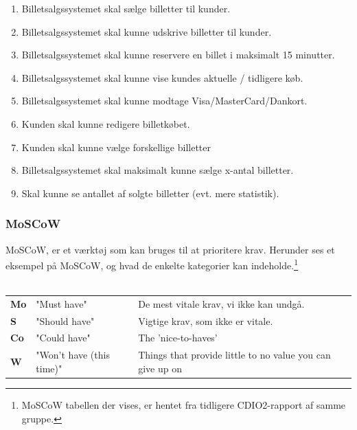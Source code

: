 \begin{enumerate}
    \item Billetsalgssystemet skal sælge billetter til kunder.
    \item Billetsalgssystemet skal kunne udskrive billetter til kunder.
    \item Billetsalgssystemet skal kunne reservere en billet i maksimalt 15 minutter.
    \item Billetsalgssystemet skal kunne vise kundes aktuelle / tidligere køb.
    \item Billetsalgssystemet skal kunne modtage Visa/MasterCard/Dankort.
    \item Kunden skal kunne redigere billetkøbet.
    \item Kunden skal kunne vælge forskellige billetter
    \item Billetsalgssystemet skal maksimalt kunne sælge x-antal billetter.
    \item Skal kunne se antallet af solgte billetter (evt. mere statistik).
\end{enumerate}

\subsubsection{MoSCoW}

MoSCoW, er et værktøj som kan bruges til at prioritere krav.
Herunder ses et eksempel på MoSCoW, og hvad de enkelte kategorier kan indeholde.\footnote{MoSCoW tabellen der vises, er hentet fra tidligere CDIO2-rapport af samme gruppe.} \\\\

\begin{tabular}{lll}
    \textbf{Mo} &   
    "Must have"                 &
    De mest vitale krav, vi ikke kan undgå. \\

    \textbf{S}  &   
    "Should have"               & 
    Vigtige krav, som ikke er vitale. \\

    \textbf{Co} &   
    "Could have"                & 
    The 'nice-to-haves' \\

    \textbf{W}  &   
    "Won’t have (this time)"    & 
    Things that provide little to no value you can give up on \\

\end{tabular}

